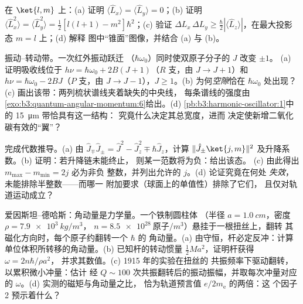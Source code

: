 \begin{exercise}[$\star\star$]\label{exo:b3:quantum-angular-momentum:9}
在 $\ket{l, m}$ 上：(a) 证明 $\langle\hat L_x\rangle = \langle\hat
L_y\rangle = 0$；(b) 证明 $\langle\hat L_x^2\rangle = \langle\hat
L_y^2\rangle = \tfrac12[l(l+1) - m^2]\hbar^2$；(c) 验证
 $\Delta L_x\,\Delta L_y \ge \tfrac\hbar2
|\langle\hat L_z\rangle|$，在最大投影态 $m = l$ 上；(d) 解释
图中“锥面”图像，并结合
(a) 与 (b)。
\end{exercise}

\begin{exercise}[$\star\star\star$]\label{exo:b3:quantum-angular-momentum:10}
振动–转动带。一次红外振动跃迁
（$\hbar\omega_0$）同时使双原子分子的 $J$ 改变 $\pm1$。
(a) 证明吸收线位于 $h\nu =
\hbar\omega_0 + 2B(J+1)$（$R$ 支，由 $J \to J+1$）和
$h\nu = \hbar\omega_0 - 2BJ$（$P$ 支，由 $J \to J-1$），$J \ge
1$。(b) 为何\emph{空隙}恰在 $\hbar\omega_0$ 处出现？(c)
画出该带：两列梳状谱线夹着缺失的中央线，
每条谱线的强度由
\cref{exo:b3:quantum-angular-momentum:6}给出。(d)
\cref{pb:b3:harmonic-oscillator:1}中的 \qty{15}{\micro m} 带恰具有这一结构：
究竟什么决定其总宽度，进而
决定使新增二氧化碳有效的“翼”？
\end{exercise}

\begin{exercise}[$\star\star\star$]\label{exo:b3:quantum-angular-momentum:11}
完成代数推导。(a) 由 $\hat J_\mp\hat J_\pm = \hat J^2 -
\hat J_z^2 \mp \hbar\hat J_z$，计算 $\|\hat J_\pm\ket{j,m}\|^2$
及升降系数。(b) 证明：若升降链未能终止，
则某一范数将为负：给出该态。
(c) 由此得出 $m_{\max} - m_{\min} = 2j$ 必为非负
整数，并列出允许的 $j$。(d) 论证究竟在何处
\emph{失效}，未能排除半整数——而哪一
附加要求（球面上的单值性）排除了它们，
且仅对轨道运动成立？
\end{exercise}

\begin{exercise}[$\star\star\star$]\label{exo:b3:quantum-angular-momentum:12}
爱因斯坦–德哈斯：角动量是力学量。一个铁制圆柱体
（半径 $a = \qty{1.0}{cm}$，密度 $\rho = \qty{7.9e3}{kg/m^3}$，
$n = \qty{8.5e28}{\text{原子}/m^3}$）悬挂于一根扭丝上，翻转
其磁化方向时，每个原子约翻转一个 $\hbar$ 的
角动量。(a) 由守恒，杆必定反冲：计算
单位体积所转移的角动量。(b) 已知杆的转动惯量 $\tfrac12 M
a^2$，证明杆获得 $\omega = 2n\hbar/\rho a^2$，
并求其数值。(c) 1915 年的实验在扭丝的
共振频率下驱动翻转，以累积微小冲量：估计
经 $Q \sim 100$ 次共振翻转后的振动振幅，并取每次冲量对应的
$\omega$。(d) 实测的磁矩与角动量之比，
恰为轨道预言值 $e/2m_{\text{e}}$ 的两倍：这
个因子 2 预示着什么？
\end{exercise}

